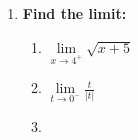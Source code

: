 \documentclass[../revisedMain.tex]{subfiles}
\begin{document}
\begin{enumerate}
	\item \textbf{Find the limit:}
	\begin{enumerate}
		\item $\lim\limits_{x\to 4^+}\displaystyle\sqrt{x+5}$
		\item $\lim\limits_{t\to 0^-}\displaystyle\frac{t}{\left| t \right|}$
		\item 
	\end{enumerate}
\end{enumerate}
\end{document}
